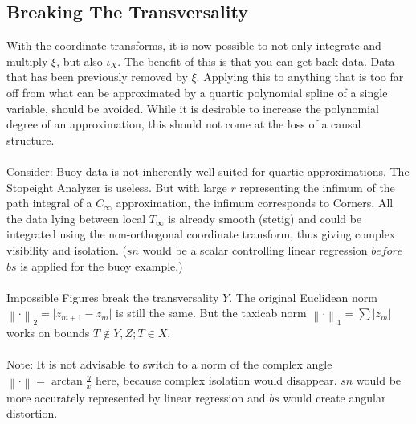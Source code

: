 \documentclass{report}
\newcommand\norm[1]{\left\lVert#1\right\rVert}
\begin{document}
\subsection{Breaking The Transversality}

With the coordinate transforms, it is now possible to not only integrate and multiply $\xi$, but also $\iota_{X}$. The benefit of this is that you can get back data. Data that has been previously removed by $\xi$. Applying this to anything that is too far off from what can be approximated by a quartic polynomial spline of a single variable, should be avoided. While it is desirable to increase the polynomial degree of an approximation, this should not come at the loss of a causal structure.\\\\
Consider: Buoy data is not inherently well suited for quartic approximations. The Stopeight Analyzer is useless. But with large $r$ representing the infimum of the path integral of a $C_{\infty}$ approximation, the infimum corresponds to Corners. All the data lying between local $T_{\infty}$ is already smooth (stetig) and could be integrated using the non-orthogonal coordinate transform, thus giving complex visibility and isolation. ($sn$ would be a scalar controlling linear regression $before$ $bs$ is applied for the buoy example.)\\\\
Impossible Figures break the transversality $Y$. The original Euclidean norm $\norm{\cdot}_2 = \lvert z_{m+1}-z_{m} \rvert$ is still the same. But the taxicab norm $\norm{\cdot}_1 = \sum \lvert z_{m} \rvert$ works on bounds $T \not \in Y,Z; T \in X$.\\\\
Note: It is not advisable to switch to a norm of the complex angle $\norm{\cdot} = \arctan \frac{y}{x}$ here, because complex isolation would disappear. $sn$ would be more accurately represented by linear regression and $bs$ would create angular distortion.
\end{document}
